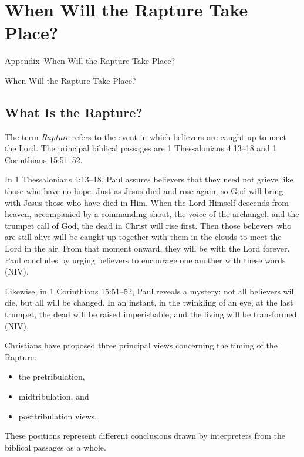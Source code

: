 {} 
\chapter*{When Will the Rapture Take Place?} 
%
         {Appendix~\thechapter\quad When Will the Rapture Take Place?}
 {\protect\numberline{\thechapter} When Will the Rapture Take Place?}




\section*{What Is the Rapture?}

The term \textit{Rapture} refers to the event in which believers are caught up to meet the Lord. The principal biblical passages are 1 Thessalonians 4:13--18 and 1 Corinthians 15:51--52.

In 1 Thessalonians 4:13--18, Paul assures believers that they need not grieve like those who have no hope. Just as Jesus died and rose again, so God will bring with Jesus those who have died in Him. When the Lord Himself descends from heaven, accompanied by a commanding shout, the voice of the archangel, and the trumpet call of God, the dead in Christ will rise first. Then those believers who are still alive will be caught up together with them in the clouds to meet the Lord in the air. From that moment onward, they will be with the Lord forever. Paul concludes by urging believers to encourage one another with these words (NIV).

Likewise, in 1 Corinthians 15:51--52, Paul reveals a mystery: not all believers will die, but all will be changed. In an instant, in the twinkling of an eye, at the last trumpet, the dead will be raised imperishable, and the living will be transformed (NIV).

Christians have proposed three principal views concerning the timing of the Rapture: 
\begin{itemize}
\item the pretribulation, 
\item midtribulation, and 
\item posttribulation views. 
\end{itemize}
These positions represent different conclusions drawn by interpreters from the biblical passages as a whole.

